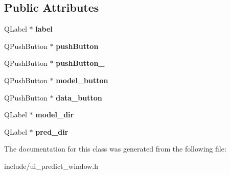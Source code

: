 \subsection*{Public Attributes}
\begin{DoxyCompactItemize}
\item 
\mbox{\label{classUi__Predict__Window_a76a125817f86e89161b99cde9e769dde}} 
Q\+Label $\ast$ {\bfseries label}
\item 
\mbox{\label{classUi__Predict__Window_aa17a629740904bee7626a69d360ee1b6}} 
Q\+Push\+Button $\ast$ {\bfseries push\+Button}
\item 
\mbox{\label{classUi__Predict__Window_a0ecde42fce26934d632f6eca829662c9}} 
Q\+Push\+Button $\ast$ {\bfseries push\+Button\+\_}
\item 
\mbox{\label{classUi__Predict__Window_aecd5f09d21f19ad91ffc217701b0aa4a}} 
Q\+Push\+Button $\ast$ {\bfseries model\+\_\+button}
\item 
\mbox{\label{classUi__Predict__Window_ab8a40d12860a898180a96e4b9d4705e9}} 
Q\+Push\+Button $\ast$ {\bfseries data\+\_\+button}
\item 
\mbox{\label{classUi__Predict__Window_a5e49390b32488d5be8b0c8e33427f77f}} 
Q\+Label $\ast$ {\bfseries model\+\_\+dir}
\item 
\mbox{\label{classUi__Predict__Window_adbb4b57e5a3de4c45e5ed76ff91e9019}} 
Q\+Label $\ast$ {\bfseries pred\+\_\+dir}
\end{DoxyCompactItemize}


The documentation for this class was generated from the following file\+:\begin{DoxyCompactItemize}
\item 
include/ui\+\_\+predict\+\_\+window.\+h\end{DoxyCompactItemize}
